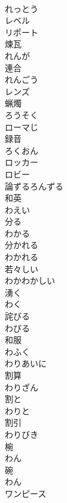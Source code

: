\documentclass[8pt]{extreport}
\begin{document}
\begin{CJK}{UTF8}{min}
\\	れっとう	
\\	レベル	
\\	リポート	
\\	煉瓦 
\\	れんが	
\\	連合 
\\	れんごう	
\\	レンズ	
\\	蝋燭 
\\	ろうそく	
\\	ローマじ	
\\	録音 
\\	ろくおん	
\\	ロッカー	
\\	ロビー	
\\	論ずるろんずる	
\\	和英 
\\	わえい	
\\	分る 
\\	わかる	
\\	分かれる 
\\	わかれる	
\\	若々しい 
\\	わかわかしい	
\\	湧く 
\\	わく	
\\	詫びる 
\\	わびる	
\\	和服 
\\	わふく	
\\	わりあいに	
\\	割算 
\\	わりざん	
\\	割と 
\\	わりと	
\\	割引 
\\	わりびき	
\\	椀 
\\	わん	
\\	碗 
\\	わん	
\\	ワンピース	
\end{CJK}
\end{document}
